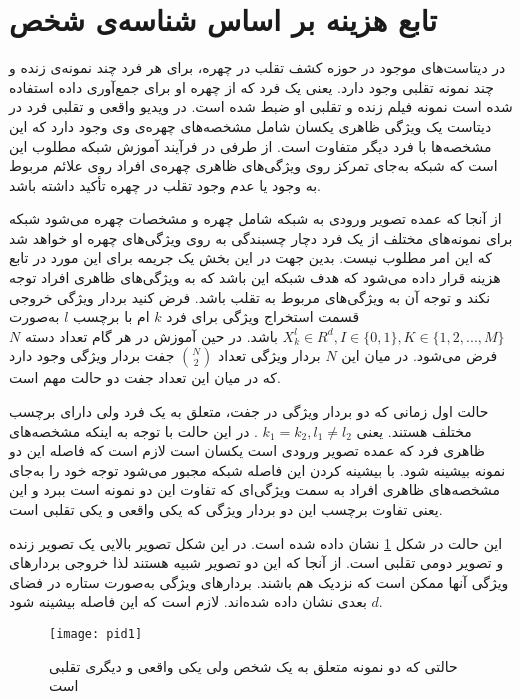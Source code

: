 \section{تابع هزینه بر اساس شناسه‌ی شخص}
در دیتاست‌های موجود در حوزه کشف تقلب در چهره، برای هر فرد چند نمونه‌ی زنده و چند نمونه تقلبی وجود دارد. یعنی یک فرد که از چهره او برای جمع‌آوری داده استفاده شده است نمونه فیلم زنده و تقلبی او ضبط شده است. در ویدیو واقعی و تقلبی فرد در دیتاست یک ویژگی ظاهری یکسان شامل مشخصه‌های چهره‌ی وی وجود دارد که این مشخصه‌ها با فرد دیگر متفاوت است. از طرفی در فرآیند آموزش شبکه مطلوب این است که شبکه به‌جای تمرکز روی ویژگی‌های ظاهری چهره‌ی افراد روی علائم مربوط به وجود یا عدم وجود تقلب در چهره تأکید داشته باشد.

از آنجا که عمده تصویر ورودی به شبکه شامل چهره و مشخصات چهره می‌شود شبکه برای نمونه‌های مختلف از یک فرد دچار چسبندگی به روی ویژگی‌های چهره او خواهد شد که این امر مطلوب نیست.       
بدین جهت در این بخش یک جریمه برای این مورد در تابع هزینه قرار داده می‌شود که هدف شبکه این باشد که به ویژگی‌های ظاهری افراد توجه نکند و توجه آن به ویژگی‌های مربوط به تقلب باشد. فرض کنید بردار ویژگی خروجی قسمت استخراج ویژگی برای فرد $k$ ام با برچسب $l$ به‌صورت 
$X_k^l \in R^d , I \in \{0,1\}, K \in \{1,2,...,M\}$
 باشد.
در حین آموزش در هر گام تعداد دسته
 $N$ 
فرض می‌شود. در میان این $N$ بردار ویژگی تعداد 
${N\choose 2}$
  جفت بردار ویژگی وجود دارد که در میان این تعداد جفت دو حالت مهم است.
  
  حالت اول زمانی که دو بردار ویژگی در جفت، متعلق به یک فرد ولی دارای برچسب مختلف هستند. یعنی 
  $k_1=k_2 , l_1 \ne l_2 $
  . در این حالت با توجه به اینکه مشخصه‌های ظاهری فرد که عمده تصویر ورودی است یکسان است لازم است که فاصله این دو نمونه بیشینه شود. با بیشینه کردن این فاصله شبکه مجبور می‌شود توجه خود را به‌جای مشخصه‌های ظاهری افراد به سمت ویژگی‌ای که تفاوت این دو نمونه است ببرد و این یعنی تفاوت برچسب این دو بردار ویژگی که یکی واقعی و یکی تقلبی است. 
  
  این حالت در شکل
\ref{fig:pid1}
  نشان داده شده است. در این شکل تصویر بالایی یک تصویر زنده و تصویر دومی تقلبی است. از آنجا که این دو تصویر شبیه هستند لذا خروجی بردارهای ویژگی آنها ممکن است که نزدیک هم باشند. بردارهای ویژگی به‌صورت ستاره در فضای $d$ بعدی نشان داده شده‌اند. لازم است که این فاصله بیشینه شود.
  
 \begin{figure}[ht]
 	\centerline{\texttt{[image: pid1]}}
 	\caption{حالتی که دو نمونه متعلق به یک شخص ولی یکی واقعی و دیگری تقلبی است}
 	\label{fig:pid1}
 \end{figure}

